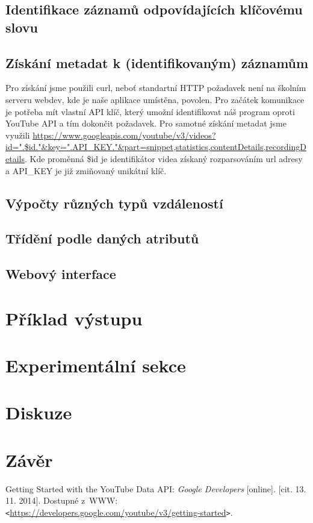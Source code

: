 \documentclass[a4paper,11pt]{article}
\begin{document}
\subsection{Identifikace záznamů odpovídajících klíčovému slovu}

\subsection{Získání metadat k (identifikovaným) záznamům}
\par Pro získání jsme použili curl, neboť standartní HTTP požadavek není na školním serveru webdev, kde je naše aplikace umístěna, povolen. Pro začátek komunikace je potřeba mít vlastní API klíč, který umožní identifikovat náš program oproti YouTube API a tím dokončit požadavek. Pro samotné získání metadat jsme využili \url{https://www.googleapis.com/youtube/v3/videos?id=".$id."&key=".API_KEY."&part=snippet,statistics,contentDetails,recordingDetails}. Kde proměnná \$id je identifikátor videa získaný rozparsováním url adresy a API\_KEY je již zmiňovaný unikátní klíč.

\subsection{Výpočty různých typů vzdáleností}

\subsection{Třídění podle daných atributů}

\subsection{Webový interface}

\section{Příklad výstupu}


\section{Experimentální sekce}


\section{Diskuze}


\section{Závěr}


\newpage
\renewcommand{\refname}{Citace}
\begin{thebibliography}{9}
	Getting Started with the YouTube Data API: \textit{Google Developers} [online]. [cit. 13. 11. 2014]. 
	Dostupné z~WWW: \verb|<|\url{https://developers.google.com/youtube/v3/getting-started}\verb|>|.

\end{thebibliography}
\end{document}
